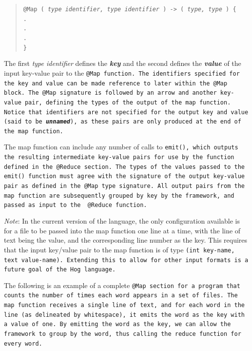 \documentclass{report}
\begin{document}
\begin{quotation} \tt @Map ( \rm \emph{type identifier, type identifier} \tt )
-> ( \rm \emph{type, type} \tt ) \{ \\ \indent \indent . \\ \indent \indent .
\\ \indent \indent . \\ \indent \tt \} \rm \end{quotation}

The first \emph{type identifier} defines the \emph{\textbf{key}} and the second
defines the \emph{\textbf{value}} of the input key-value pair to the \tt @Map
\rm function. The identifiers specified for the key and value can be made
reference to later within the \tt @Map \rm block. The \tt @Map \rm signature is
followed by an arrow and another key-value pair, defining the types of the
output of the map function. Notice that identifiers are not specified for the
output key and value (said to be \emph{\textbf{unnamed}}), as these pairs are
only produced at the end of the map function. 

The map function can include any number of calls to \tt emit()\rm, which outputs
the resulting intermediate key-value pairs for use by the function defined in the
\tt @Reduce \rm section. The types of the values passed to the \tt emit() \rm
function must agree with the signature of the output key-value pair as defined in
the \tt @Map \rm type signature. All output pairs from the map function are
subsequently grouped by key by the framework, and passed as input to the \tt
@Reduce \rm function.

\emph{Note}: In the current version of the language, the only configuration
available is for a file to be passed into the map function one line at a time,
with the line of text being the value, and the corresponding line number as the
key. This requires that the input key/value pair to the map function is of type
\tt (int key‐name, text value‐name)\rm. Extending this to allow for other input
formats is a future goal of the Hog language.

The following is an example of a complete \tt @Map \rm section for a program that
counts the number of times each word appears in a set of files. The map function
receives a single line of text, and for each word in the line (as delineated by
whitespace), it emits the word as the key with a value of one. By emitting the word
as the key, we can allow the framework to group by the word, thus calling the
reduce function for every word.
\end{document}
